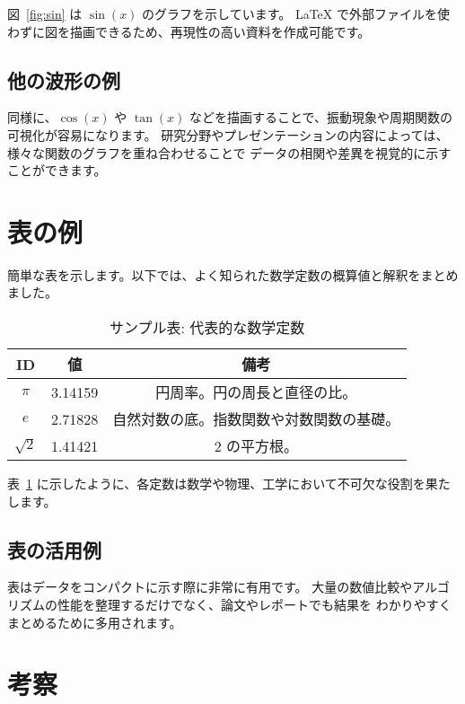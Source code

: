 \documentclass[a4paper,10.5pt]{ltjsarticle}
\begin{document}
図~\ref{fig:sin} は $\sin(x)$ のグラフを示しています。
LaTeX で外部ファイルを使わずに図を描画できるため、再現性の高い資料を作成可能です。

\subsection{他の波形の例}
同様に、$\cos(x)$ や $\tan(x)$ などを描画することで、振動現象や周期関数の可視化が容易になります。
研究分野やプレゼンテーションの内容によっては、様々な関数のグラフを重ね合わせることで
データの相関や差異を視覚的に示すことができます。

\section{表の例}
簡単な表を示します。以下では、よく知られた数学定数の概算値と解釈をまとめました。

\begin{table}[h]
\centering
\caption{サンプル表: 代表的な数学定数}
\label{tbl:sample}
\begin{tabular}{c|c|c}
\hline
\textbf{ID} & \textbf{値} & \textbf{備考} \\
\hline
$\pi$   & 3.14159 & 円周率。円の周長と直径の比。 \\
$e$     & 2.71828 & 自然対数の底。指数関数や対数関数の基礎。 \\
$\sqrt{2}$ & 1.41421 & 2 の平方根。 \\
\hline
\end{tabular}
\end{table}

表~\ref{tbl:sample} に示したように、各定数は数学や物理、工学において不可欠な役割を果たします。

\subsection{表の活用例}
表はデータをコンパクトに示す際に非常に有用です。
大量の数値比較やアルゴリズムの性能を整理するだけでなく、論文やレポートでも結果を
わかりやすくまとめるために多用されます。


\clearpage
\section{考察}
\end{document}
